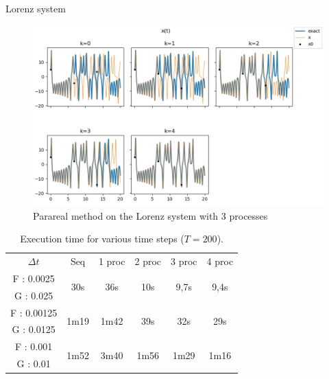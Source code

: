 \begin{frame}[allowframebreaks]{Lorenz system}
	\newpage

	\begin{minipage}{\linewidth}
	\begin{figure}
		\centering       
		\includegraphics[width=0.7\linewidth]{"images/parareal/lorenz_3p.jpg"}
		\caption{Parareal method on the Lorenz system with 3 processes}
	\end{figure}
	\end{minipage}

	
	\begin{table}[H]
		\centering
		\begin{tabular}{| c || c | c | c | c | c |}
			\hline
			\multirow{2}{1.5 cm}{$\Delta t$} & \multirow{2}{1.5 cm}{Seq} & \multirow{2}{1.5 cm}{1 proc} & \multirow{2}{1.5 cm}{2 proc} & \multirow{2}{1.5 cm}{3 proc} &\multirow{2}{1.5 cm}{4 proc} \\
			& & & & & \\
			\hline 
			F : 0.0025 & \multirow{2}{1.5 cm}{30s} & \multirow{2}{1.5 cm}{36s} & \multirow{2}{1.5 cm}{10s} & \multirow{2}{1.5 cm}{9,7s} & \multirow{2}{1.5 cm}{9,4s} \\
			G : 0.025 & & & & & \\
			\hline 
			F : 0.00125 & \multirow{2}{1.5 cm}{1m19} & \multirow{2}{1.5 cm}{1m42} & \multirow{2}{1.5 cm}{39s} & \multirow{2}{1.5 cm}{32s} & \multirow{2}{1.5 cm}{29s} \\
			G : 0.0125 & & & & & \\
			\hline 
			F : 0.001 & \multirow{2}{1.5 cm}{1m52} & \multirow{2}{1.5 cm}{3m40} & \multirow{2}{1.5 cm}{1m56} & \multirow{2}{1.5 cm}{1m29} & \multirow{2}{1.5 cm}{1m16} \\
			G : 0.01 & & & & & \\	 
			\hline
		\end{tabular}
		\caption{Execution time for various time steps ($T=200$).}
		\label{time}
	\end{table}

\end{frame}
